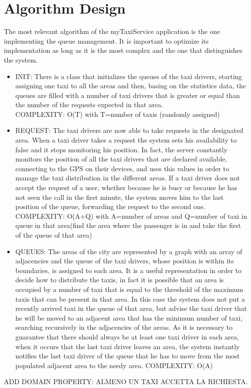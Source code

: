 \documentclass[18pt,oneside,a4paper, titlepage]{article}
\begin{document}
	
	\newpage
	
	\section{Algorithm Design}
		The most relevant algorithm of the myTaxiService application is the one implementing the queue management. It is important to optimize its implementation as long as it is the most complex and the one that distinguishes the system.\\
		\begin{itemize}
			\item INIT: There is a class that initializes the queues of the taxi drivers, starting assigning one taxi to all the areas and then, basing on the statistics data, the queues are filled with a number of taxi drivers that is greater or equal than the number of the requests expected in that area.\\
			COMPLEXITY: O(T) with T=number of taxis (randomly assigned)
			\item REQUEST: The taxi drivers are now able to take requests in the designated area. When a taxi driver takes a request the system sets his availability to false and it stops monitoring his position. In fact, the server constantly monitors the position of all the taxi drivers that are declared available, connecting to the GPS on their devices, and uses this values in order to manage the taxi distribution in the different areas. If a taxi driver does not accept the request of a user, whether because he is busy or because he has not seen the call in the first minute, the system moves him to the last position of the queue, forwarding the request to the second one.\\
			COMPLEXITY: O(A+Q) with A=number of areas and Q=number of taxi in queue in that area(find the area where the passenger is in and take the first of the queue of that area)
			\item QUEUES: The areas of the city are represented by a graph with an array of adjacencies and the queue of the taxi drivers, whose position is within its boundaries, is assigned to each area. It is a useful representation in order to decide how to distribute the taxis, in fact it is possible that an area is occupied by a number of taxi that is equal to the threshold of the maximum taxis that can be present in that area. In this case the system does not put a recently arrived taxi in the queue of that area, but advise the taxi driver that he will be moved to an adjacent area that has the minimum number of taxi, searching recursively in the adjacencies of the areas. As it is necessary to guarantee that there should always be at least one taxi driver in each area, when it occurs that the last taxi driver leaves an area, the system instantly notifies the last taxi driver of the queue that he has to move from the most populated adjacent area to the needy area.
			COMPLEXITY: O(A)
		\end{itemize}
		
	ADD DOMAIN PROPERTY: ALMENO UN TAXI ACCETTA LA RICHIESTA.
	
	
\end{document}
